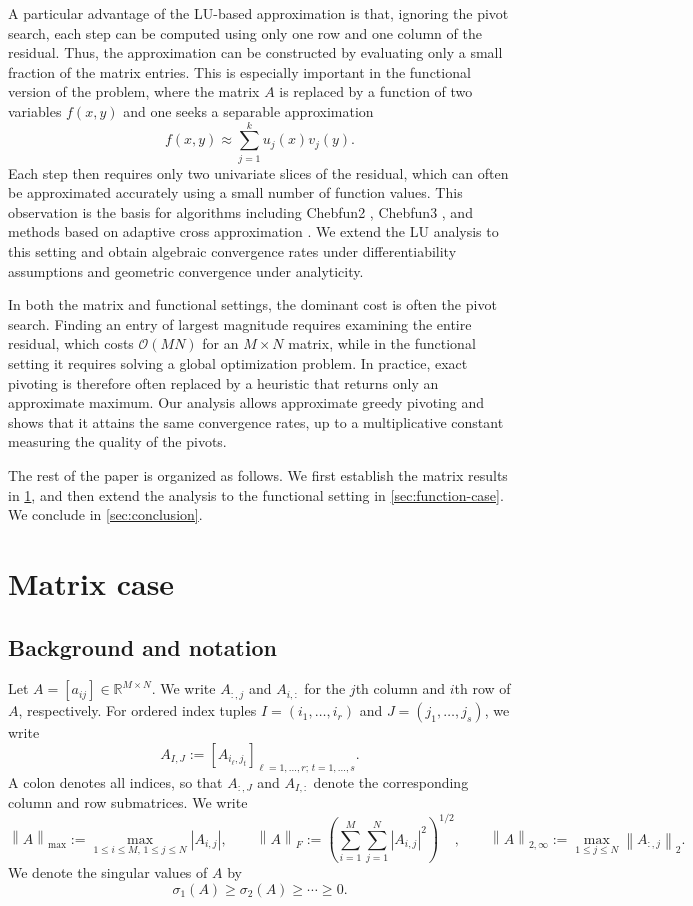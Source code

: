 \documentclass[11pt]{article}
\theoremstyle{definition}
\theoremstyle{remark}
\newcommand{\R}{\mathbb{R}}
\newcommand{\norm}[1]{\left\lVert #1\right\rVert}
\newcommand{\abs}[1]{\left\lvert #1\right\rvert}
\begin{document}
A particular advantage of the LU-based approximation is that, ignoring
the pivot search, each step can be computed using only one row and one
column of the residual. Thus, the approximation can be constructed by
evaluating only a small fraction of the matrix entries. This is especially
important in the functional version of the problem, where the matrix $A$
is replaced by a function of two variables $f(x,y)$ and one seeks a
separable approximation
\begin{equation*}
    f(x,y)
    \approx
    \sum_{j=1}^k u_j(x)v_j(y).
\end{equation*}
Each step then requires only two univariate slices of the residual, which
can often be approximated accurately using a small number of function
values. This observation is the basis for algorithms including Chebfun2
\cite{TownsendTrefethen2013}, Chebfun3
\cite{HashemiTrefethen2017}, and methods based on adaptive cross
approximation \cite{Bebendorf2000,Bebendorf2011}. We extend the LU
analysis to this setting and obtain algebraic convergence rates under
differentiability assumptions and geometric convergence under
analyticity.

In both the matrix and functional settings, the dominant cost is often
the pivot search. Finding an entry of largest magnitude requires examining
the entire residual, which costs $\mathcal O(MN)$ for an
$M\times N$ matrix, while in the functional setting it requires solving
a global optimization problem. In practice, exact pivoting is therefore
often replaced by a heuristic that returns only an approximate maximum.
Our analysis allows approximate greedy pivoting and shows that it attains
the same convergence rates, up to a multiplicative constant measuring the
quality of the pivots.

The rest of the paper is organized as follows.
We first establish the matrix results in \cref{sec:matrix-case}, and then
extend the analysis to the functional setting in
\cref{sec:function-case}. We conclude in \cref{sec:conclusion}.


\section{Matrix case}
\label{sec:matrix-case}

\subsection{Background and notation}
\label{sec:background}
Let $A=[a_{ij}]\in\R^{M\times N}$. We write $A_{:,j}$ and $A_{i,:}$
for the $j$th column and $i$th row of $A$, respectively. For ordered
index tuples $I=(i_1,\ldots,i_r)$ and $J=(j_1,\ldots,j_s)$, we write
\[
    A_{I,J}
    :=
    [A_{i_\ell,j_t}]_{\ell=1,\ldots,r;\,t=1,\ldots,s}.
\]
A colon denotes all indices, so that $A_{:,J}$ and $A_{I,:}$ denote the
corresponding column and row submatrices.
We write
\[
    \norm{A}_{\max}
    :=
    \max_{1\le i\le M,\,1\le j\le N}\abs{A_{i,j}},
    \qquad
    \norm{A}_F
    :=
    \left(
        \sum_{i=1}^M\sum_{j=1}^N \abs{A_{i,j}}^2
    \right)^{1/2},
    \qquad
    \norm{A}_{2,\infty}
    :=
    \max_{1\le j\le N}\norm{A_{:,j}}_2.
\]
We denote the singular values of $A$ by
\[
    \sigma_1(A)\ge\sigma_2(A)\ge\cdots\ge0.
\]
\end{document}
